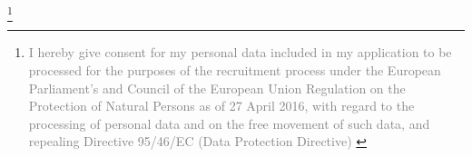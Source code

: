 \documentclass[10pt,a4paper,ragged2e,withhyper, normalphoto]{altacv}
\newcommand\blfootnote[1]{%
  \begingroup
  \renewcommand\thefootnote{}\footnote{#1}%
  \addtocounter{footnote}{-1}%
  \endgroup
}
\begin{document}
\begin{paracol}{2}
\smallskip
\blfootnote{\textcolor{gray}{
I hereby give consent for my personal data included in my application to be processed for the purposes of the recruitment process under the European Parliament's and Council of the European Union Regulation on the Protection of Natural Persons as of 27 April 2016, with regard to the processing of personal data and on the free movement of such data, and repealing Directive 95/46/EC (Data Protection Directive)
}}





\end{paracol}
\end{document}
